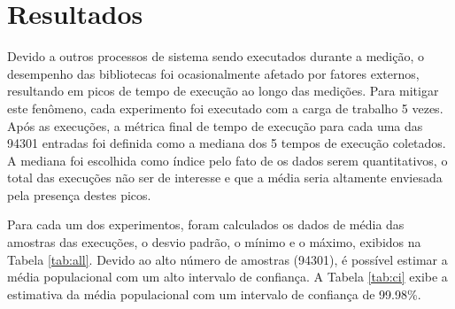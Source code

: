 \section{Resultados}

Devido a outros processos de sistema sendo executados durante a medição, o desempenho das bibliotecas foi ocasionalmente afetado por fatores externos, resultando em picos de tempo de execução ao longo das medições. Para mitigar este fenômeno, cada experimento foi executado com a carga de trabalho 5 vezes. Após as execuções, a métrica final de tempo de execução para cada uma das 94301 entradas foi definida como a mediana dos 5 tempos de execução coletados. A mediana foi escolhida como índice pelo fato de os dados serem quantitativos, o total das execuções não ser de interesse e que a média seria altamente enviesada pela presença destes picos.

Para cada um dos experimentos, foram calculados os dados de média das amostras das execuções, o desvio padrão, o mínimo e o máximo, exibidos na Tabela \ref{tab:all}. Devido ao alto número de amostras (94301), é possível estimar a média populacional com um alto intervalo de confiança. A Tabela \ref{tab:ci} exibe a estimativa da média populacional com um intervalo de confiança de 99.98\%.

